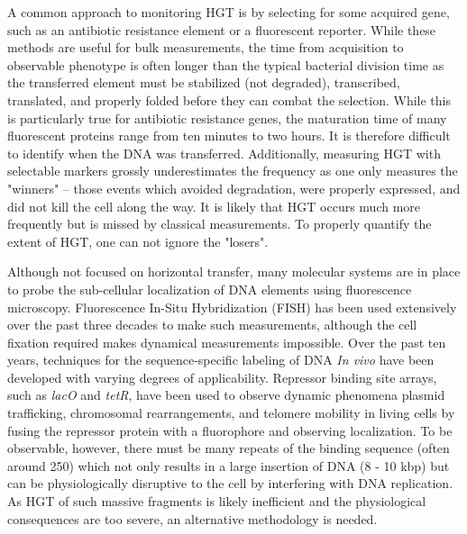 A common approach to monitoring HGT is by selecting for some acquired gene, such
as an antibiotic resistance element or a fluorescent reporter. While these
methods are useful for bulk measurements, the time from acquisition to
observable phenotype is often longer than the typical bacterial division time as
the transferred element must be stabilized (not degraded), transcribed,
translated, and properly folded before they can combat the selection. While this
is particularly true for antibiotic resistance genes, the maturation time of
many fluorescent proteins range from ten minutes to two
hours\cite{Iizuka:2011ia}. It is therefore difficult to identify when the DNA
was transferred. Additionally, measuring HGT with selectable markers grossly underestimates the
frequency as one only measures the "winners" -- those events which avoided
degradation, were properly expressed, and did not kill the cell along the way.
It is likely that HGT occurs much more frequently but is missed by classical
measurements. To properly quantify the extent of HGT, one can not ignore the
"losers".


Although not focused on horizontal transfer, many molecular systems are in place
to  probe the sub-cellular localization of DNA elements using fluorescence
microscopy. Fluorescence In-Situ Hybridization (FISH) has been used extensively
over the past three decades to make such measurements\cite{Levsky:2003bz},
although the cell fixation required makes dynamical measurements impossible.
Over the past ten years, techniques for the sequence-specific labeling of DNA
\textit{In vivo} have been developed with varying degrees of applicability.
Repressor binding site arrays, such as \textit{lacO} and \textit{tetR}, have
been used to observe dynamic phenomena plasmid trafficking\cite{Ho:1911wf},
chromosomal rearrangements\cite{Lau:2004bp}, and telomere
mobility\cite{Jegou:2009kb} in living cells by fusing the repressor protein with
a fluorophore and observing localization. To be observable, however, there must
be many repeats of the binding sequence (often around 250) which not only
results in a large insertion of DNA (8 - 10 kbp) but can be physiologically
disruptive to the cell by interfering with DNA replication\cite{Dubarry:2011bx,
Payne:2006fc}. As HGT of such massive fragments is likely inefficient and the
physiological consequences are too severe, an alternative methodology is needed.


